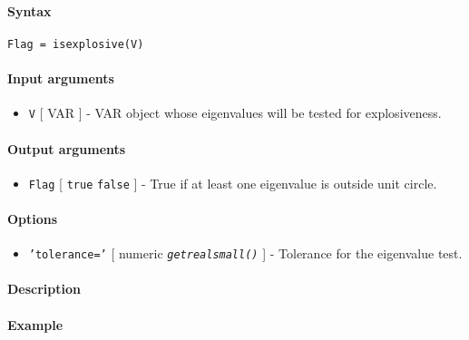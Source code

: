 


	\paragraph{Syntax}

\begin{verbatim}
Flag = isexplosive(V)
\end{verbatim}

\paragraph{Input arguments}

\begin{itemize}
\itemsep1pt\parskip0pt
\item
  \texttt{V} {[} VAR {]} - VAR object whose eigenvalues will be tested
  for explosiveness.
\end{itemize}

\paragraph{Output arguments}

\begin{itemize}
\itemsep1pt\parskip0pt
\item
  \texttt{Flag} {[} \texttt{true} \textbar{} \texttt{false} {]} - True
  if at least one eigenvalue is outside unit circle.
\end{itemize}

\paragraph{Options}

\begin{itemize}
\itemsep1pt\parskip0pt
\item
  \texttt{'tolerance='} {[} numeric \textbar{}
  \emph{\texttt{getrealsmall()}} {]} - Tolerance for the eigenvalue
  test.
\end{itemize}

\paragraph{Description}

\paragraph{Example}


